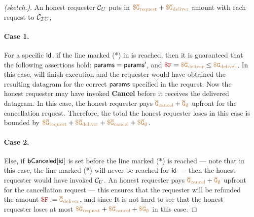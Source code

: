 \begin{proof}[(sketch.)]
An honest requester ${\cal C}_U$  
puts in 
$\tt {\color{brown} \$ \overline{G}_{\text{request}} } + 
\tt {\color{brown} \$ \overline{G}_{\text{deliver}} }$
amount with each request to ${\cal C}_{TC}$,

\paragraph{Case 1.}
For a specific ${\sf id}$,
if the line marked (*) %
in \tcont
is reached,
then it is guaranteed that the following assertions
hold:
${\sf params} = {\sf params}'$,
and $\smaroon{\$ F} = \sbrown{\$ \overline{G}_{\text{deliver}}} \leq 
\sbrown{\$ G_{\text{deliver}}}$.
In this case, 
\tcont will finish execution and the requester
would have obtained the resulting 
datagram for the correct ${\sf params}$ specified in the request.
Now the honest requester may have invoked {\bf Cancel}
before it receives the delivered datagram. 
In this case, the honest requester pays $\tt {\color{brown} \overline{G}_{\text{cancel}} } + 
\tt {\color{brown} \overline{G}_\emptyset }$
upfront for the cancellation request.
Therefore, the total the honest requester loses in this case
is bounded by 
$\tt {\color{brown} \$ \overline{G}_{\text{request}} } + \tt {\color{brown} \$ \overline{G}_{\text{deliver}} } + 
\tt {\color{brown} \$ \overline{G}_{\text{cancel}} }
+ \tt {\color{brown} \$ \overline{G}_{\emptyset} }$.


\paragraph{Case 2.}
Else, if 
${\sf bCanceled}[{\sf id}]$ is set before 
the line marked (*) 
is reached --- note that in this case, the line 
marked (*) will never be reached for ${\sf id}$ --- 
then the honest requester would have invoked  ${\cal C}_U$.
An honest requester pays $\tt {\color{brown} \overline{G}_{\text{cancel}} } + 
\tt {\color{brown} \overline{G}_\emptyset }$
upfront for the cancellation request --- this ensures that
the requester will be refunded the amount $\smaroon{\${F}} := \sbrown{\overline{G}_{\text{deliver}}}$, and since
It is not hard to see that the honest requester loses at most
$\tt {\color{brown} \$ \overline{G}_{\text{request}} } + 
\tt {\color{brown} \$ \overline{G}_{\text{cancel}} }
+ \tt {\color{brown} \$ \overline{G}_{\emptyset} }$ in this case.
\end{proof}
